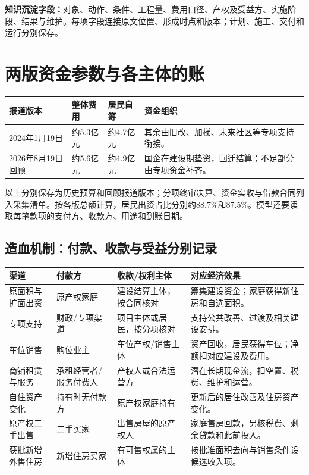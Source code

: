 \documentclass[UTF8,11pt,fontset=windows]{ctexart}
\newcommand{\src}[1]{\cite{#1}}
\begin{document}
\textbf{知识沉淀字段：}对象、动作、条件、工程量、费用口径、产权及受益方、实施阶段、结果与维护。每项字段连接原文位置、形成时点和版本；计划、施工、交付和运行分别保存。

\newpage
\section{两版资金参数与各主体的账}
\noindent\begin{tabularx}{\textwidth}{@{}L{36mm}L{29mm}L{31mm}Y@{}}
\toprule
\textbf{报道版本} & \textbf{整体费用} & \textbf{居民自筹} & \textbf{资金组织}\\
\midrule
2024年1月19日 & 约5.3亿元 & 约4.7亿元 & 其余由旧改、加梯、未来社区等专项支持衔接。\src{S03}\\
2026年8月19日回顾 & 约5.6亿元 & 约4.9亿元 & 国企在建设期垫资，回迁结算；不足部分由专项资金补齐。\src{S08}\\
\bottomrule
\end{tabularx}

以上分别保存为历史预算和回顾报道版本；分项终审决算、资金实收与借款合同列入采集清单。按各版总额计算，居民出资占比分别约88.7\%和87.5\%。模型还要读取每笔款项的支付方、收款方、用途和到账日期。

\subsection{造血机制：付款、收款与受益分别记录}
\small
\noindent\begin{tabularx}{\textwidth}{@{}L{24mm}L{27mm}YY@{}}
\toprule
\textbf{渠道} & \textbf{付款方} & \textbf{收款/权利主体} & \textbf{对应经济效果}\\
\midrule
原面积与扩面出资 & 原产权家庭 & 建设结算主体，按合同核对 & 筹集建设资金；家庭获得新住房和自选面积。\\
专项支持 & 财政/专项渠道 & 项目主体或居民，按分项核对 & 支持公共改善、过渡及相关建设安排。\\
车位销售 & 购位业主 & 车位产权/销售主体 & 资产回收，居民获得车位；净额扣对应建设及费用。\\
商铺租赁与服务 & 承租经营者/服务付费人 & 产权人或合法运营方 & 潜在长期现金流，扣空置、税费、维护和运营。\\
自住资产变化 & 持有时无付款方 & 原产权家庭持有 & 更新后的居住改善及住房资产变化。\\
原产权二手出售 & 二手买家 & 出售房屋的原产权人 & 家庭售房回款，另核税费、剩余贷款和此前投入。\\
获批新增外售住房 & 新增住房买家 & 有可售权属的主体 & 按批准面积去向与销售条件设候选收入项。\\
\bottomrule
\end{tabularx}
\normalsize
\end{document}
